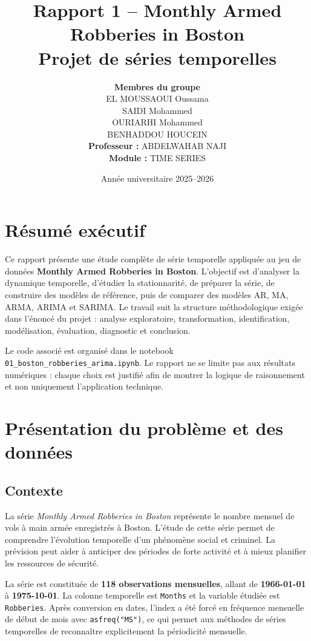 \documentclass[12pt,a4paper]{report}
\title{\textbf{Rapport 1 -- Monthly Armed Robberies in Boston}\\[0.4cm]\large Projet de séries temporelles}
\author{\textbf{Membres du groupe}\\ EL MOUSSAOUI Oussama\\
SAIDI Mohammed\\
OURIARHI Mohammed\\
BENHADDOU HOUCEIN \\[0.5cm]\textbf{Professeur :} ABDELWAHAB NAJI\\\textbf{Module :} TIME SERIES}
\date{Année universitaire 2025--2026}
\begin{document}
\maketitle
\clearpage
\renewcommand{\contentsname}{Table des matières}
\tableofcontents
\clearpage

\chapter*{Résumé exécutif}
Ce rapport présente une étude complète de série temporelle appliquée au jeu de données \textbf{Monthly Armed Robberies in Boston}. L'objectif est d'analyser la dynamique temporelle, d'étudier la stationnarité, de préparer la série, de construire des modèles de référence, puis de comparer des modèles AR, MA, ARMA, ARIMA et SARIMA. Le travail suit la structure méthodologique exigée dans l'énoncé du projet : analyse exploratoire, transformation, identification, modélisation, évaluation, diagnostic et conclusion.

Le code associé est organisé dans le notebook \texttt{01\_boston\_robberies\_arima.ipynb}. Le rapport ne se limite pas aux résultats numériques : chaque choix est justifié afin de montrer la logique de raisonnement et non uniquement l'application technique.

\chapter{Présentation du problème et des données}
\section{Contexte}
La série \textit{Monthly Armed Robberies in Boston} représente le nombre mensuel de vols à main armée enregistrés à Boston. L'étude de cette série permet de comprendre l'évolution temporelle d'un phénomène social et criminel. La prévision peut aider à anticiper des périodes de forte activité et à mieux planifier les ressources de sécurité.

La série est constituée de \textbf{118 observations mensuelles}, allant de \textbf{1966-01-01} à \textbf{1975-10-01}. La colonne temporelle est \texttt{Months} et la variable étudiée est \texttt{Robberies}. Après conversion en dates, l'index a été forcé en fréquence mensuelle de début de mois avec \texttt{asfreq("MS")}, ce qui permet aux méthodes de séries temporelles de reconnaître explicitement la périodicité mensuelle.
\end{document}

